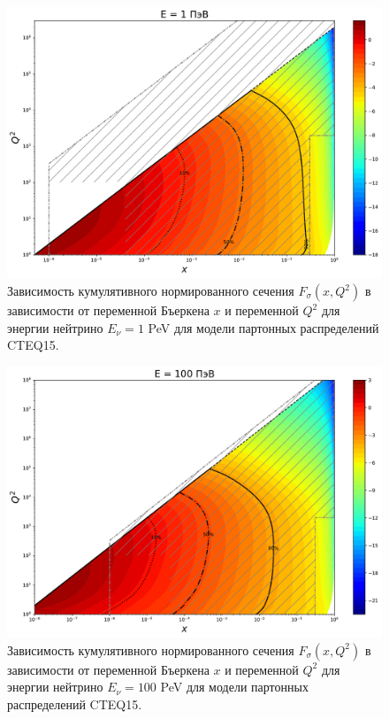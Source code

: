 \begin{figure}[!h]
\centering
\includegraphics[width=0.97\linewidth]{"images/NuProp/cdfxq2_cc_proton_CT18ZNNLO_14_1000000.pdf"}
\caption{Зависимость кумулятивного нормированного сечения $F_{\sigma}(x,Q^2)$ в зависимости от переменной Бъеркена $x$ и переменной $Q^2$ для энергии нейтрино $E_{\nu} = 1$ PeV для модели партонных распределений CTEQ15\cite{ncteq15}.}
\label{Pp6}
\end{figure}
\begin{figure}[!h]
\centering
\includegraphics[width=0.97\linewidth]{"images/NuProp/cdfxq2_cc_proton_CT18ZNNLO_14_100000000.pdf"}
\caption{Зависимость кумулятивного нормированного сечения $F_{\sigma}(x,Q^2)$ в зависимости от переменной Бъеркена $x$ и переменной $Q^2$ для энергии нейтрино $E_{\nu} = 100$ PeV для модели партонных распределений CTEQ15\cite{ncteq15}.}
\label{Pp8}
\end{figure}
